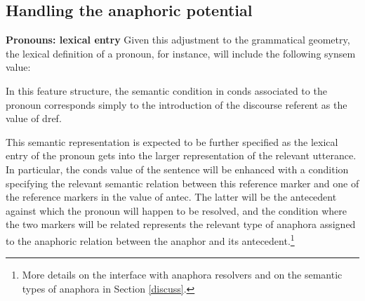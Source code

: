 \documentclass[output=paper
,modfonts
,nonflat]{langsci/langscibook}
\begin{document}
\subsection{Handling the anaphoric potential}

\textbf{Pronouns: lexical entry} Given this adjustment to the grammatical geometry, 
the lexical definition of a pronoun,
for instance, will include the following {\sc synsem} value:

\begin{exe}

\ex\label{pronfeat}
\avmfont{\sc}
\avmvalfont{\it}
\begin{avm}
\end{avm}
\end{exe}





In this feature structure, the semantic condition in {\sc conds} associated
to the pronoun corresponds simply to the introduction of the discourse referent 
as the value of {\sc dref}.

This semantic representation is expected
to be further specified as the lexical entry of the
pronoun gets into the larger representation of the
relevant utterance. In particular, the {\sc conds} value of the sentence
will be enhanced with a condition specifying the
relevant semantic relation between this reference marker
and one of the reference markers in the value
of {\sc antec}. The latter will be the antecedent against
which the pronoun will happen to be resolved, and the
condition where the two markers will be related represents the
relevant type of anaphora assigned to the anaphoric relation
between the anaphor and its antecedent.\footnote{
More details on the interface with anaphora resolvers and on the semantic types of anaphora in Section \ref{discuss}.}
\end{document}
